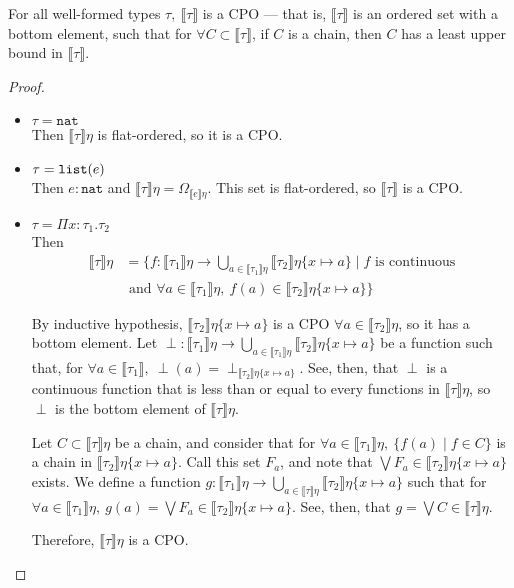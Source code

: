  \begin{thm}
For all well-formed types $\tau, \ \llbracket \tau \rrbracket$ is a CPO --- that is, $\llbracket \tau \rrbracket$ is an ordered 
set with a bottom element, such that for $\forall C \subset \llbracket \tau \rrbracket$, if  $C$ is a chain, then $C$ has a 
least upper bound in $\llbracket \tau \rrbracket$. \\
\end{thm}
\begin{proof} 
\begin{itemize}
\item $\tau = \texttt{nat}$ \\
Then $\llbracket \tau \rrbracket\eta$ is flat-ordered, so it is a CPO.
\item $\tau = \texttt{list}(e)$ \\
Then $e : \texttt{nat}$ and $\llbracket \tau \rrbracket\eta = \Omega_{\llbracket e \rrbracket\eta}$. This set is flat-ordered,
so $\llbracket \tau \rrbracket$ is a CPO.
\item $\tau = \Pi x:\tau_1.\tau_2$ \\
Then 
\begin{align*}
\llbracket \tau \rrbracket\eta &=  \{f: \llbracket \tau_1 \rrbracket\eta \rightarrow 
 \bigcup_{a \in \llbracket \tau_1 \rrbracket\eta} \llbracket \tau_2 \rrbracket\eta\{x \mapsto a\}
 \mid f \text{ is continuous} \\
 &\text{\ \ \ \ and } \forall a \in \llbracket \tau_1 \rrbracket\eta, \ f(a) \in \llbracket \tau_2 \rrbracket\eta\{x\mapsto a\}\}
 \end{align*} 

 By inductive hypothesis, $\llbracket \tau_2 \rrbracket\eta\{x\mapsto a\}$ is a CPO
 $\forall a \in \llbracket \tau_2 \rrbracket\eta$, so it has a bottom element. 
 Let $\perp : \llbracket \tau_1 \rrbracket\eta \rightarrow 
 \bigcup_{a \in \llbracket \tau_1 \rrbracket\eta} \llbracket \tau_2 \rrbracket\eta\{x \mapsto a\}$ be a function such that, for 
 $\forall a \in \llbracket \tau_1 \rrbracket, \ \perp(a) = \perp_{\llbracket \tau_2 \rrbracket\eta\{x\mapsto a\}}$. See, then,
 that $\perp$ is a continuous function that is less than or equal to every functions in $\llbracket \tau \rrbracket\eta$,
 so $\perp$ is the bottom element of $\llbracket \tau \rrbracket\eta$.
 
 Let $C \subset \llbracket \tau \rrbracket\eta$ be a chain, and consider that for $\forall a \in \llbracket \tau_1\rrbracket\eta,
 \ \{f(a) \mid f \in C\}$ is a chain in $ \llbracket \tau_2 \rrbracket\eta\{x\mapsto a\}$. Call this set $F_a$, and note that $
 \bigvee F_a \in \llbracket \tau_2 \rrbracket\eta\{x\mapsto a\}$ exists. We define a 
 function $g: \llbracket \tau_1\rrbracket\eta \rightarrow \bigcup_{a \in \llbracket \tau \rrbracket\eta} \llbracket \tau_2 
 \rrbracket\eta\{x\mapsto a\}$ such that for $\forall a \in \llbracket \tau_1\rrbracket\eta, \ g(a) = \bigvee F_a \in \llbracket 
 \tau_2 \rrbracket\eta\{x\mapsto a\}$. See, then, that $g = \bigvee C \in \llbracket \tau \rrbracket\eta$.
 
 Therefore, $\llbracket\tau\rrbracket\eta$ is a CPO.
\end{itemize}
\end{proof}

